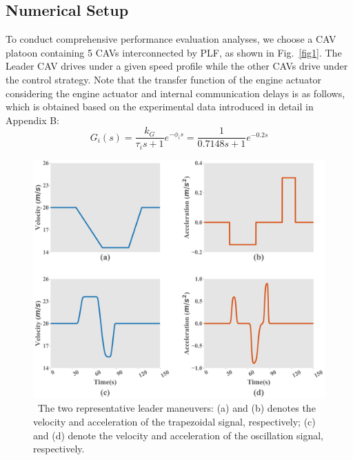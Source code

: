 \documentclass[a4paper]{cas-sc}
\begin{document}
\subsection{Numerical Setup}
\label{Section 5.1}

To conduct comprehensive performance evaluation analyses, we choose a CAV platoon containing 5 CAVs interconnected by PLF, as shown in Fig.~\ref{fig1}. The Leader CAV drives under a given speed profile while the other CAVs drive under the control strategy. Note that the transfer function of the engine actuator considering the engine actuator and internal communication delays is as follows, which is obtained based on the experimental data introduced in detail in Appendix B:
\begin{equation}
  G_i(s)=\frac{k_G}{\tau_is+1}e^{-\phi_is}=\frac{1}{0.7148s+1}e^{-0.2s}
  \label{eq51}
\end{equation}

\begin{figure}

  \centering
  \includegraphics[width=14cm]{figs/fig2.png}
  \caption{~The two representative leader maneuvers: (a) and (b) denotes the velocity and acceleration of the trapezoidal signal, respectively; (c) and (d) denote the velocity and acceleration of the oscillation signal, respectively.}
  \label{fig2}

\end{figure}
\end{document}
